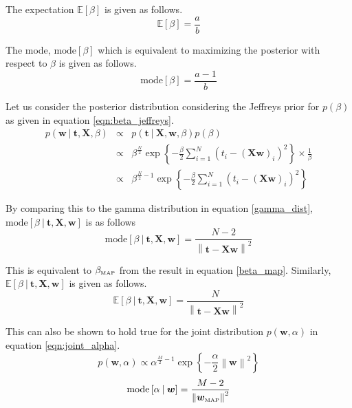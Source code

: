 \documentclass[11pt]{article}
\newcommand{\mean}[1]{\mathbb{E}\left[#1\right]}
\newcommand{\map}[1]{{#1}_{\text{\tiny MAP}}}
\newcommand\given[1][]{\:#1\vert\:}
\newcommand{\norm}[1]{\left\lVert#1\right\rVert}
\begin{document}
The expectation $\mean{\beta}$ is given as follows.
\begin{equation}
    \mean{\beta} = \frac{a}{b}
\end{equation}

The mode, $\text{mode}\left[\beta\right]$ which is equivalent to maximizing the posterior with respect to $\beta$ is given as follows.
\begin{equation} \label{mode}
    \text{mode}\left[\beta\right] = \frac{a-1}{b}
\end{equation}

Let us consider the posterior distribution considering the Jeffreys prior for $p(\beta)$ as given in equation \ref{eqn:beta_jeffreys}.
\begin{eqnarray}
    p(\bm{w} \given \bm{t}, \bm{X}, \beta) 
    &\propto& p(\bm{t} \given \bm{X}, \bm{w}, \beta) p(\beta) \\
    &\propto& \beta^{\frac{N}{2}}\exp\left\{-\frac{\beta}{2} \sum_{i=1}^N(t_i - (\bm{X}\bm{w})_i)^2 \right\} \times \frac{1}{\beta} \\
    &\propto& \beta^{\frac{N}{2}-1}\exp\left\{-\frac{\beta}{2} \sum_{i=1}^N(t_i - (\bm{X}\bm{w})_i)^2 \right\}
\end{eqnarray}

By comparing this to the gamma distribution in equation \ref{gamma_dist}, $\text{mode}\left[\beta \given \bm{t}, \bm{X}, \bm{w}\right]$ is as follows
\begin{equation}
    \text{mode}\left[\beta \given \bm{t}, \bm{X}, \bm{w}\right] = \frac{N-2}{\norm{\bm{t} - \bm{X}\bm{w}}^2}
\end{equation}

This is equivalent to $\map{\beta}$ from the result in equation \ref{beta_map}. Similarly, $\mean{\beta \given \bm{t}, \bm{X}, \bm{w}}$ is given as follows.
\begin{equation}
    \mean{\beta \given \bm{t}, \bm{X}, \bm{w}} = \frac{N}{\norm{\bm{t} - \bm{X}\bm{w}}^2}
\end{equation}

This can also be shown to hold true for the joint distribution $p(\bm{w}, \alpha)$ in equation \ref{eqn:joint_alpha}.
\begin{equation}
    p(\bm{w},\alpha) \propto \alpha^{\frac{M}{2}-1}\exp{\left\{ -\frac{\alpha}{2}\norm{\bm{w}}^2\right\}}
\end{equation}
\begin{equation}
    \text{mode}\left[\alpha \given \bm{w}\right] = \frac{M-2}{\norm{\map{\bm{w}}}^2}
\end{equation}
\end{document}
